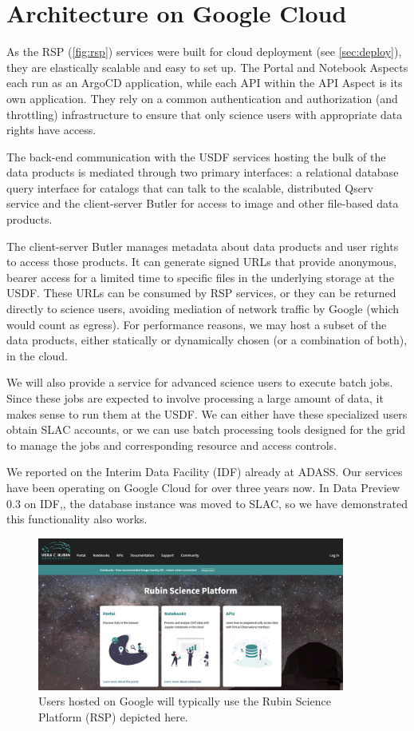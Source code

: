 \section{Architecture on Google Cloud} \label{sec:google}

As the RSP (\autoref{fig:rsp})  services were built for cloud deployment (see \autoref{sec:deploy}), they are elastically scalable and easy to set up.
The Portal and Notebook Aspects each run as an ArgoCD application, while each API within the API Aspect is its own application.
They rely on a common authentication and authorization (and throttling) infrastructure to ensure that only science users with appropriate data rights have access.

The back-end communication with the USDF services hosting the bulk of the data products is mediated through two primary interfaces: a relational database query interface for catalogs that can talk to the scalable, distributed Qserv service\cite{2011Wang:2011:QDS:2063348.2063364, DMTN-243} and the client-server Butler\cite{2024SPIE13101.129Jtmp,2022SPIE12189E..11J} for access to image and other file-based data products.

The client-server Butler manages metadata about data products and user rights to access those products.
It can generate signed URLs that provide anonymous, bearer access for a limited time to specific files in the underlying storage at the USDF.
These URLs can be consumed by RSP services, or they can be returned directly to science users, avoiding mediation of network traffic by Google (which would count as egress).
For performance reasons, we may host a subset of the data products, either statically or dynamically chosen (or a combination of both), in the cloud.

We will also provide a service for advanced science users to execute batch jobs.
Since these jobs are expected to involve processing a large amount of data, it makes sense to run them at the USDF.
We can either have these specialized users obtain SLAC accounts, or we can use batch processing tools designed for the grid to manage the jobs and corresponding resource and access controls.

We reported on the Interim Data Facility (IDF) already at ADASS\cite{2021arXiv211115030O}.
Our services have been operating on Google Cloud for over three years now.
In Data Preview 0.3 on IDF,\cite{RTN-050}, the database instance was moved to SLAC, so we have demonstrated this functionality also works.


\begin{figure}
\begin{centering}
\includegraphics[width=0.9\textwidth]{RSP.png}
	\caption{ Users hosted on Google will typically use the Rubin Science Platform (RSP) depicted here.  \label{fig:rsp}}
\end{centering}
\end{figure}
